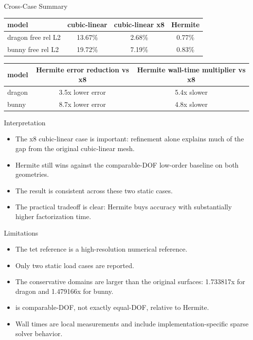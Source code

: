 \documentclass[aspectratio=169,10pt]{beamer}
\newcommand{\case}[1]{\texttt{\detokenize{#1}}}
\newcommand{\pct}[1]{#1\%}
\newcommand{\good}[1]{\textcolor{pgoGreen}{#1}}
\begin{document}
\begin{frame}{Cross-Case Summary}
  \small
  \begin{table}
    \centering
    \begin{tabular}{lccc}
      \toprule
      model & cubic-linear & cubic-linear x8 & Hermite \\
      \midrule
      dragon free rel L2 & \pct{13.67} & \pct{2.68} & \good{\pct{0.77}} \\
      bunny free rel L2 & \pct{19.72} & \pct{7.19} & \good{\pct{0.83}} \\
      \bottomrule
    \end{tabular}
  \end{table}

  \vspace{0.8em}
  \begin{table}
    \centering
    \begin{tabular}{lcc}
      \toprule
      model & Hermite error reduction vs x8 & Hermite wall-time multiplier vs x8 \\
      \midrule
      dragon & 3.5x lower error & 5.4x slower \\
      bunny & 8.7x lower error & 4.8x slower \\
      \bottomrule
    \end{tabular}
  \end{table}
\end{frame}

\begin{frame}{Interpretation}
  \small
  \begin{itemize}
    \item The x8 cubic-linear case is important: refinement alone explains much of the gap from the original cubic-linear mesh.
    \item Hermite still wins against the comparable-DOF low-order baseline on both geometries.
    \item The result is consistent across these two static cases.
    \item The practical tradeoff is clear: Hermite buys accuracy with substantially higher factorization time.
  \end{itemize}
\end{frame}

\begin{frame}{Limitations}
  \small
  \begin{itemize}
    \item The tet reference is a high-resolution numerical reference.
    \item Only two static load cases are reported.
    \item The conservative domains are larger than the original surfaces: 1.733817x for dragon and 1.479166x for bunny.
    \item \case{cubic_linear_x8} is comparable-DOF, not exactly equal-DOF, relative to Hermite.
    \item Wall times are local measurements and include implementation-specific sparse solver behavior.
  \end{itemize}
\end{frame}
\end{document}
